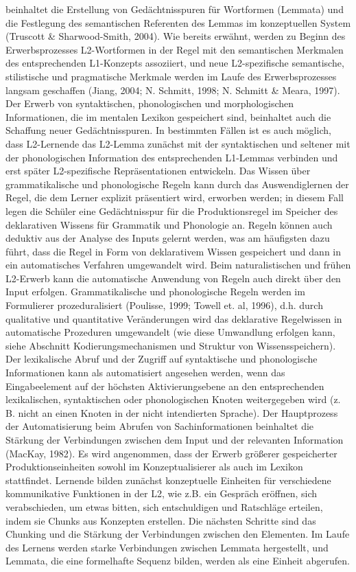 \documentclass[
  letterpaper,
]{scrbook}
\begin{document}
beinhaltet die Erstellung von Gedächtnisspuren für Wortformen (Lemmata)
und die Festlegung des semantischen Referenten des Lemmas im
konzeptuellen System (Truscott \& Sharwood-Smith, 2004). Wie bereits
erwähnt, werden zu Beginn des Erwerbsprozesses L2-Wortformen in der
Regel mit den semantischen Merkmalen des entsprechenden L1-Konzepts
assoziiert, und neue L2-spezifische semantische, stilistische und
pragmatische Merkmale werden im Laufe des Erwerbsprozesses langsam
geschaffen (Jiang, 2004; N. Schmitt, 1998; N. Schmitt \& Meara, 1997).
Der Erwerb von syntaktischen, phonologischen und morphologischen
Informationen, die im mentalen Lexikon gespeichert sind, beinhaltet auch
die Schaffung neuer Gedächtnisspuren. In bestimmten Fällen ist es auch
möglich, dass L2-Lernende das L2-Lemma zunächst mit der syntaktischen
und seltener mit der phonologischen Information des entsprechenden
L1-Lemmas verbinden und erst später L2-spezifische Repräsentationen
entwickeln. Das Wissen über grammatikalische und phonologische Regeln
kann durch das Auswendiglernen der Regel, die dem Lerner explizit
präsentiert wird, erworben werden; in diesem Fall legen die Schüler eine
Gedächtnisspur für die Produktionsregel im Speicher des deklarativen
Wissens für Grammatik und Phonologie an. Regeln können auch deduktiv aus
der Analyse des Inputs gelernt werden, was am häufigsten dazu führt,
dass die Regel in Form von deklarativem Wissen gespeichert und dann in
ein automatisches Verfahren umgewandelt wird. Beim naturalistischen und
frühen L2-Erwerb kann die automatische Anwendung von Regeln auch direkt
über den Input erfolgen. Grammatikalische und phonologische Regeln
werden im Formulierer prozeduralisiert (Poulisse, 1999; Towell et. al,
1996), d.h. durch qualitative und quantitative Veränderungen wird das
deklarative Regelwissen in automatische Prozeduren umgewandelt (wie
diese Umwandlung erfolgen kann, siehe Abschnitt Kodierungsmechanismen
und Struktur von Wissensspeichern). Der lexikalische Abruf und der
Zugriff auf syntaktische und phonologische Informationen kann als
automatisiert angesehen werden, wenn das Eingabeelement auf der höchsten
Aktivierungsebene an den entsprechenden lexikalischen, syntaktischen
oder phonologischen Knoten weitergegeben wird (z. B. nicht an einen
Knoten in der nicht intendierten Sprache). Der Hauptprozess der
Automatisierung beim Abrufen von Sachinformationen beinhaltet die
Stärkung der Verbindungen zwischen dem Input und der relevanten
Information (MacKay, 1982). Es wird angenommen, dass der Erwerb größerer
gespeicherter Produktionseinheiten sowohl im Konzeptualisierer als auch
im Lexikon stattfindet. Lernende bilden zunächst konzeptuelle Einheiten
für verschiedene kommunikative Funktionen in der L2, wie z.B. ein
Gespräch eröffnen, sich verabschieden, um etwas bitten, sich
entschuldigen und Ratschläge erteilen, indem sie Chunks aus Konzepten
erstellen. Die nächsten Schritte sind das Chunking und die Stärkung der
Verbindungen zwischen den Elementen. Im Laufe des Lernens werden starke
Verbindungen zwischen Lemmata hergestellt, und Lemmata, die eine
formelhafte Sequenz bilden, werden als eine Einheit abgerufen.
\end{document}
